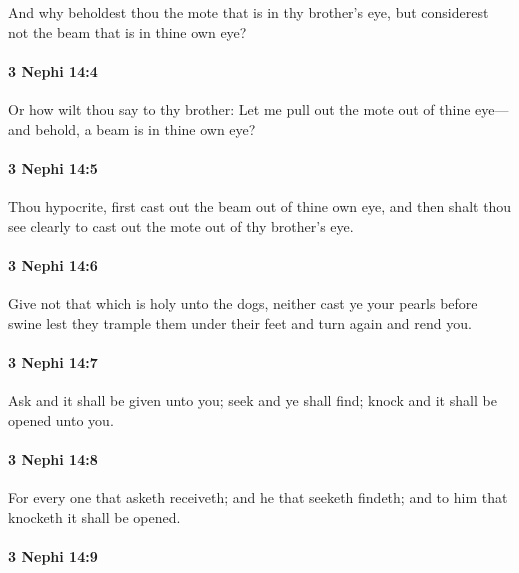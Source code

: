 			And why beholdest thou the mote that is in thy brother's eye,
			but considerest not the beam that is in thine own eye?

		\paragraph{3 Nephi 14:4} %
			\label{3NEPHI-14-4}

			Or how wilt thou say to thy brother:
			Let me pull out the mote out of thine eye---
			and behold, a beam is in thine own eye?

		\paragraph{3 Nephi 14:5} %
			\label{3NEPHI-14-5}

			Thou hypocrite, first cast out the beam out of thine own eye,
			and then shalt thou see clearly to cast out the mote out of thy brother's eye.

		\paragraph{3 Nephi 14:6} %
			\label{3NEPHI-14-6}

			Give not that which is holy unto the dogs,
			neither cast ye your pearls before swine
			lest they trample them under their feet and turn again and rend you.

		\paragraph{3 Nephi 14:7} %
			\label{3NEPHI-14-7}

			Ask and it shall be given unto you;
			seek and ye shall find;
			knock and it shall be opened unto you.

		\paragraph{3 Nephi 14:8} %
			\label{3NEPHI-14-8}

			For every one that asketh receiveth;
			and he that seeketh findeth;
			and to him that knocketh it shall be opened.

		\paragraph{3 Nephi 14:9} %
			\label{3NEPHI-14-9}

